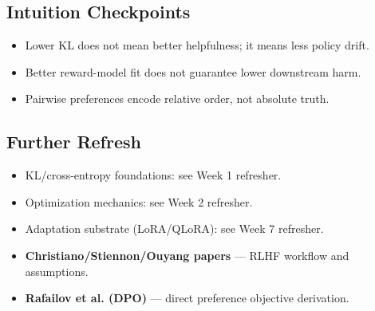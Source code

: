 \subsection*{Intuition Checkpoints}
\begin{itemize}[leftmargin=1.5em]
  \item Lower KL does not mean better helpfulness; it means less policy drift.
  \item Better reward-model fit does not guarantee lower downstream harm.
  \item Pairwise preferences encode relative order, not absolute truth.
\end{itemize}

\subsection*{Further Refresh}
\begin{itemize}[leftmargin=1.5em]
  \item KL/cross-entropy foundations: see Week 1 refresher.
  \item Optimization mechanics: see Week 2 refresher.
  \item Adaptation substrate (LoRA/QLoRA): see Week 7 refresher.
  \item \textbf{Christiano/Stiennon/Ouyang papers} --- RLHF workflow and assumptions.
  \item \textbf{Rafailov et al. (DPO)} --- direct preference objective derivation.
\end{itemize}
